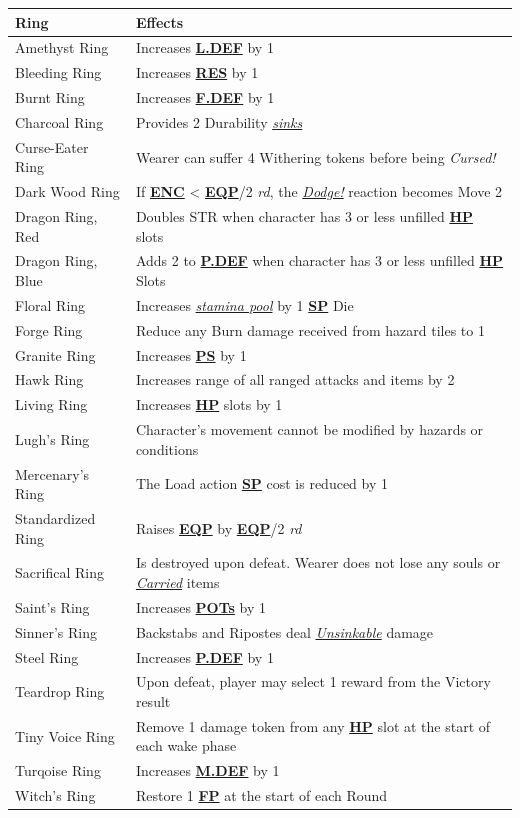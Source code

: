 \documentclass[12pt]{article}
\newcommand{\refto}[1]{\hyperlink{#1}{\textbf{#1}}}
\newcommand{\reftoit}[1]{\hyperlink{#1}{\emph{#1}}}
\begin{document}
\begin{center}
\begin{tabularx}{\textwidth}{p{}p{}}
\hline
\rowcolor{white} \textbf{Ring} & \textbf{Effects}\setcounter{rownum}{0}\\
\hline
Amethyst Ring & Increases \refto{L.DEF} by 1\\
Bleeding Ring & Increases \refto{RES} by 1\\
Burnt Ring & Increases \refto{F.DEF} by 1 \\
Charcoal Ring & Provides 2 Durability \reftoit{sinks} \\
Curse-Eater Ring & Wearer can suffer 4 Withering tokens before being \emph{Cursed!}\\
Dark Wood Ring & If \refto{ENC} < \refto{EQP}/2 \emph{rd}, the \reftoit{Dodge!} reaction becomes Move 2 \\
Dragon Ring, Red & Doubles STR when character has 3 or less unfilled \refto{HP} slots \\
Dragon Ring, Blue & Adds 2 to \refto{P.DEF} when character has 3 or less unfilled \refto{HP} Slots \\
Floral Ring & Increases \reftoit{stamina pool} by 1 \refto{SP} Die \\
Forge Ring & Reduce any Burn damage received from hazard tiles to 1 \\
Granite Ring & Increases \refto{PS} by 1 \\
Hawk Ring & Increases range of all ranged attacks and items by 2\\
Living Ring & Increases \refto{HP} slots by 1 \\
Lugh’s Ring & Character’s movement cannot be modified by hazards or conditions\\
Mercenary’s Ring & The Load action \refto{SP} cost is reduced by 1 \\
Standardized Ring & Raises \refto{EQP} by \refto{EQP}/2 \emph{rd} \\
Sacrifical Ring & Is destroyed upon defeat. Wearer does not lose any souls or \reftoit{Carried} items\\
Saint’s Ring & Increases \refto{POTs} by 1\\
Sinner’s Ring & Backstabs and Ripostes deal \reftoit{Unsinkable} damage \\
Steel Ring & Increases \refto{P.DEF} by 1 \\
Teardrop Ring & Upon defeat, player may select 1 reward from the Victory result\\
Tiny Voice Ring & Remove 1 damage token from any \refto{HP} slot at the start of each wake phase \\
Turqoise Ring & Increases \refto{M.DEF} by 1\\
Witch’s Ring & Restore 1 \refto{FP} at the start of each Round\\
\hline
\end{tabularx}
\end{center}
\end{document}
